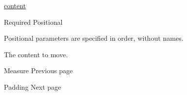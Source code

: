 \href{/docs/reference/foundations/content/}{content}

{Required} {{ Positional }}

\label{parameters-body-positional-tooltip}
Positional parameters are specified in order, without names.

The content to move.

\href{/docs/reference/layout/measure/}{\pandocbounded{}}

{ Measure } { Previous page }

\href{/docs/reference/layout/pad/}{\pandocbounded{}}

{ Padding } { Next page }

